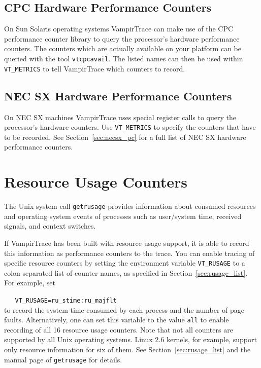 \documentclass[a4paper,twoside,12pt,BCOR12mm]{scrbook}
\begin{document}
\subsection*{CPC Hardware Performance Counters}

  On Sun Solaris operating systems VampirTrace can make use of the CPC
  performance counter library to query the processor's hardware performance counters.
  The counters which are actually available on your platform can be queried with
  the tool \texttt{vtcpcavail}. The listed names can then be used within
  \texttt{VT\_METRICS} to tell VampirTrace which counters to record.

\subsection*{NEC SX Hardware Performance Counters}

  On NEC SX machines VampirTrace uses special register calls to query the processor's 
  hardware counters. Use \texttt{VT\_METRICS} to specify the counters that have to be
  recorded. See Section~\ref{sec:necsx_pc} for a full list of NEC SX hardware performance 
  counters.

\section{Resource Usage Counters}
\label{sec:rusage_counters}

  The Unix system call \texttt{getrusage} provides information about consumed
  resources and operating system events of processes
  such as user/system time, received signals, and context switches.
  
  If VampirTrace has been built with resource usage support, it is able
  to record this information as performance counters to the trace.
  You can enable tracing of specific resource counters by setting the environment
  variable \texttt{VT\_RUSAGE} to a colon-separated list of counter names, as
  specified in Section~\ref{sec:rusage_list}. For example, set

  \vspace{1ex}
  \verb|   VT_RUSAGE=ru_stime:ru_majflt|
  \vspace{1ex}\\
  to record the system time consumed by each process and the number of page faults.
  Alternatively, one can set this variable to the value \texttt{all} to
  enable recording of all 16 resource usage counters.
  Note that not all counters are supported by all Unix operating systems.
  Linux 2.6 kernels, for example, support only resource information for six of them.
  See Section~\ref{sec:rusage_list} and the manual page of \texttt{getrusage} for details.
  
\end{document}
